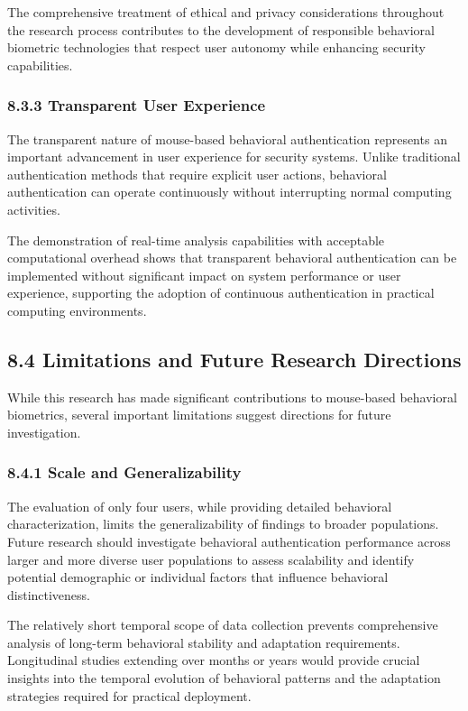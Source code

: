 \documentclass[
  11pt,
  a4paper,
]{article}
\begin{document}
The comprehensive treatment of ethical and privacy considerations
throughout the research process contributes to the development of
responsible behavioral biometric technologies that respect user autonomy
while enhancing security capabilities.

\subsubsection{8.3.3 Transparent User
Experience}\label{transparent-user-experience}

The transparent nature of mouse-based behavioral authentication
represents an important advancement in user experience for security
systems. Unlike traditional authentication methods that require explicit
user actions, behavioral authentication can operate continuously without
interrupting normal computing activities.

The demonstration of real-time analysis capabilities with acceptable
computational overhead shows that transparent behavioral authentication
can be implemented without significant impact on system performance or
user experience, supporting the adoption of continuous authentication in
practical computing environments.

\subsection{8.4 Limitations and Future Research
Directions}\label{limitations-and-future-research-directions}

While this research has made significant contributions to mouse-based
behavioral biometrics, several important limitations suggest directions
for future investigation.

\subsubsection{8.4.1 Scale and
Generalizability}\label{scale-and-generalizability}

The evaluation of only four users, while providing detailed behavioral
characterization, limits the generalizability of findings to broader
populations. Future research should investigate behavioral
authentication performance across larger and more diverse user
populations to assess scalability and identify potential demographic or
individual factors that influence behavioral distinctiveness.

The relatively short temporal scope of data collection prevents
comprehensive analysis of long-term behavioral stability and adaptation
requirements. Longitudinal studies extending over months or years would
provide crucial insights into the temporal evolution of behavioral
patterns and the adaptation strategies required for practical
deployment.
\end{document}
